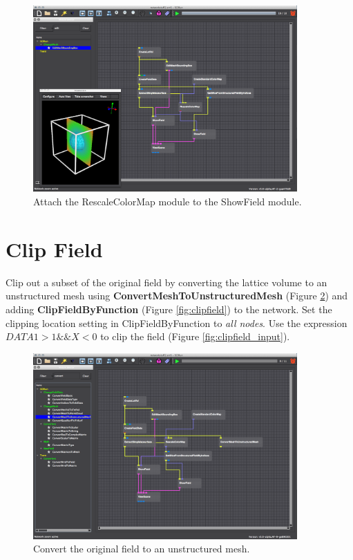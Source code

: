 \documentclass[fleqn,11pt,openany]{book}
\begin{document}
\begin{figure}[H]
\center
\includegraphics[width=0.9\textwidth]{BasicTutorial_figures/colorslice.png}
\caption{Attach the RescaleColorMap module to the ShowField module.}
\label{fig:showslice}
\end{figure}

\section{Clip Field}\label{clipfieldfunc}

Clip out a subset of the original field by converting the lattice volume to an unstructured mesh using \textbf{ConvertMeshToUnstructuredMesh} (Figure \ref{fig:convertmesh}) and adding \textbf{ClipFieldByFunction} (Figure \ref{fig:clipfield}) to the network.
Set the clipping location setting in ClipFieldByFunction to \emph{all nodes}.
Use the expression $DATA1> 1 \&\& X < 0$ to clip the field (Figure \ref{fig:clipfield_input}).

\begin{figure}[H]
\center
\includegraphics[width=0.9\textwidth]{BasicTutorial_figures/convertmesh.png}
\caption{Convert the original field to an unstructured mesh.}
\label{fig:convertmesh}
\end{figure}
\end{document}
